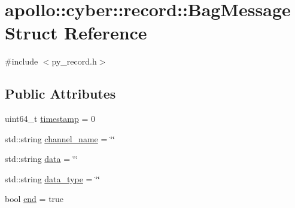 \hypertarget{structapollo_1_1cyber_1_1record_1_1BagMessage}{\section{apollo\-:\-:cyber\-:\-:record\-:\-:Bag\-Message Struct Reference}
\label{structapollo_1_1cyber_1_1record_1_1BagMessage}
}


{\ttfamily \#include $<$py\-\_\-record.\-h$>$}

\subsection*{Public Attributes}
\begin{DoxyCompactItemize}
\item 
uint64\-\_\-t \hyperlink{structapollo_1_1cyber_1_1record_1_1BagMessage_afe7fffa20a64414ff8a5cf710ce9a06c}{timestamp} = 0
\item 
std\-::string \hyperlink{structapollo_1_1cyber_1_1record_1_1BagMessage_ac3ab88f059bb07ecd48d9fc3af2f001d}{channel\-\_\-name} = \char`\"{}\char`\"{}
\item 
std\-::string \hyperlink{structapollo_1_1cyber_1_1record_1_1BagMessage_af57cc78e5af39036a2b5374795a31dc0}{data} = \char`\"{}\char`\"{}
\item 
std\-::string \hyperlink{structapollo_1_1cyber_1_1record_1_1BagMessage_a2b36d8c047935f60f4d4fa42fa984c46}{data\-\_\-type} = \char`\"{}\char`\"{}
\item 
bool \hyperlink{structapollo_1_1cyber_1_1record_1_1BagMessage_ab5656e5d9f1be2b9cc239bd09cf469f0}{end} = true
\end{DoxyCompactItemize}


